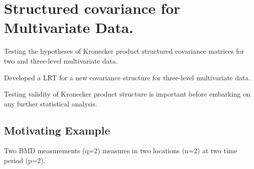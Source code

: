 \documentclass[Chap1main.tex]{subfiles}
\begin{document}

\section{Structured covariance for Multivariate Data.}

Testing the hypotheses of Kronecker product structured covariance matrices for two and three-level multivariate data.

Developed a LRT for a new covariance structure for three-level multivariate data.

Testing validity of Kronecker product structure is important before embarking on any further statistical analysis.

\subsection{Motivating Example}

Two BMD measurements (q=2) measures in two locations (u=2) at two time period (p=2).

\end{document}
